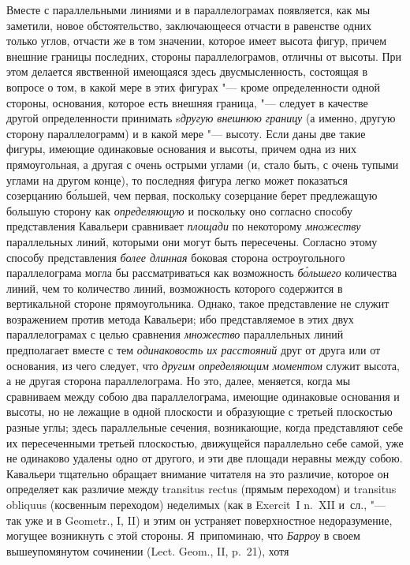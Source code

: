 Вместе с параллельными линиями и в параллелограмах появляется, как мы заметили,
новое обстоятельство, заключающееся отчасти в равенстве одних только углов,
отчасти же в том значении, которое имеет высота фигур, причем внешние границы
последних, стороны параллелограмов, отличны от высоты. При этом делается
явственной имеющаяся здесь двусмысленность, состоящая в вопросе о том, в какой
мере в этих фигурах "--- кроме определенности одной стороны, основания, которое
есть внешняя граница, "--- следует в качестве другой определенности принимать
s{\em другую внешнюю границу} (а именно, другую сторону параллелограмм) и в
какой мере "--- высоту. Если даны две такие фигуры, имеющие одинаковые
основания и высоты, причем одна из них прямоугольная, а другая с очень острыми
углами (и, стало быть, с очень тупыми углами на другом конце), то последняя
фигура легко может показаться созерцанию б\'{о}льшей, чем первая, поскольку
созерцание берет предлежащую большую сторону как {\em определяющую} и поскольку
оно согласно способу представления Кавальери сравнивает {\em площади} по
некоторому {\em множеству} параллельных линий, которыми они могут быть
пересечены. Согласно этому способу представления {\em более длинная} боковая
сторона остроугольного параллелограма могла бы рассматриваться как возможность
{\em б\'{о}льшего} количества линий, чем то количество линий, возможность
которого содержится в вертикальной стороне прямоугольника. Однако, такое
представление не служит возражением против метода Кавальери; ибо представляемое
в этих двух параллелограмах с целью сравнения {\em множество} параллельных
линий предполагает вместе с тем {\em одинаковость их расстояний} друг от друга
или от основания, из чего следует, что {\em другим определяющим моментом}
служит высота, а не другая сторона параллелограма. Но это, далее, меняется,
когда мы сравниваем между собою два параллелограма, имеющие одинаковые
основания и высоты, но не лежащие в одной плоскости и образующие с третьей
плоскостью разные углы; здесь параллельные сечения, возникающие, когда
представляют себе их пересеченными третьей плоскостью, движущейся параллельно
себе самой, уже не одинаково удалены одно от другого, и эти две площади неравны
между собою. Кавальери тщательно обращает внимание читателя на это различие,
которое он определяет как различие между transitus rectus (прямым переходом) и
transitus obliquus (косвенным переходом) неделимых (как в Exercit~I n.~XII
и~сл., "--- так уже и в Geometr., I, II) и этим он устраняет поверхностное
недоразумение, могущее возникнуть с этой стороны. Я~припоминаю, что
{\em Барроу} в своем вышеупомянутом сочинении (Lect. Geom., II, p.~21), хотя
